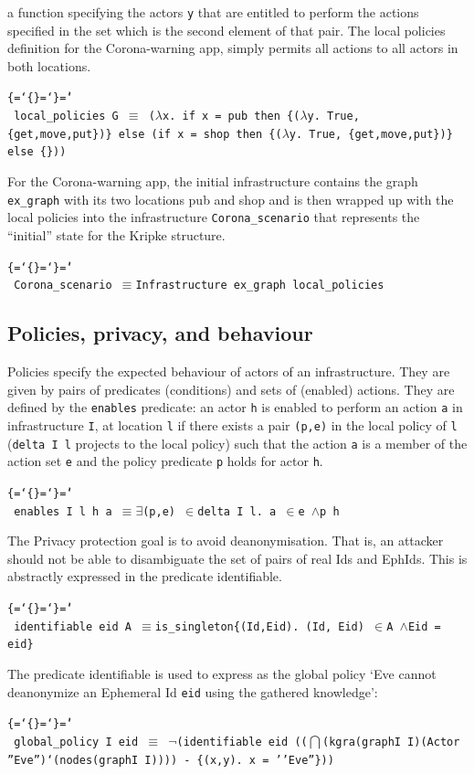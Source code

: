\documentclass{llncs}
\newenvironment{ttbox}{\begin{alltt}\ttbraces\small\tt}%
                      {\end{alltt}}
\def\ttbraces{\let\.=\nobreak\chardef\{=`\{\chardef\}=`\}\chardef\|=`\\}
\newcommand\ttand{\mbox{{$\land$}}}
\newcommand\ttfun{\mbox{{$\Rightarrow$}}}
\newcommand\ttequiv{\mbox{{$\equiv$}}}
\newcommand\ttexists{\mbox{{$\exists$}}}
\newcommand\ttneg{\mbox{{$\neg$}}}
\newcommand\ttin{\mbox{{$\in$}}}
\newcommand\ttlam{\mbox{\( \lambda \)}}
\newcommand\tttimes{\mbox{\( \times \)}}
\newcommand\ttbigcap{\mbox{{$\bigcap$}}}
\begin{document}
a function specifying the actors \texttt{y} that are entitled to perform the actions 
specified in the set which is the second element of that pair.
The local policies definition for the Corona-warning app, simply permits all actions to
all actors in both locations.
\begin{ttbox}
  local_policies G \ttequiv
         (\ttlam x. if x = pub then  \{(\ttlam y. True, \{get,move,put\})\}
          else (if x = shop then \{(\ttlam y. True, \{get,move,put\})\} else \{\}))
\end{ttbox}  
For the Corona-warning app, the initial infrastructure contains the graph \texttt{ex\_graph}
with its two locations pub and shop and is then wrapped up with the local policies
into the infrastructure \texttt{Corona\_scenario} 
that represents the ``initial'' state for the Kripke structure.
\begin{ttbox}
 Corona_scenario \ttequiv Infrastructure  ex_graph local_policies
\end{ttbox}

\subsection{Policies, privacy, and behaviour}
\label{sec:}
Policies specify the expected behaviour of actors of an infrastructure. 
They are given by pairs of predicates (conditions) and sets of (enabled) actions.
They are defined by the \texttt{enables} predicate:
an actor \texttt{h} is enabled to perform an action \texttt{a} 
in infrastructure \texttt{I}, at location \texttt{l}
if there exists a pair \texttt{(p,e)} in the local policy of \texttt{l}
(\texttt{delta I l} projects to the local policy) such that the action 
\texttt{a} is a member of the action set \texttt{e} and the policy 
predicate \texttt{p} holds for actor \texttt{h}.
\begin{ttbox}
enables I l h a \ttequiv \ttexists (p,e) \ttin delta I l. a \ttin e \ttand p h
\end{ttbox} 

The Privacy protection goal is to avoid deanonymisation. That is, an attacker should not be able to
disambiguate the set of pairs of real Ids and EphIds. This is abstractly expressed in the predicate
identifiable.
\begin{ttbox}
identifiable eid A \ttequiv is_singleton\{(Id,Eid). (Id, Eid) \ttin A \ttand Eid = eid\}
\end{ttbox}
The predicate identifiable is used to express as the global policy `Eve cannot deanonymize an Ephemeral
Id \texttt{eid} using the gathered knowledge':
\begin{ttbox}
  global_policy I eid \ttequiv
             \ttneg(identifiable eid 
                ((\ttbigcap (kgra(graphI I)(Actor ''Eve'')`(nodes(graphI I))))
                 - \{(x,y). x = ''Eve''\}))
\end{ttbox}
\end{document}
